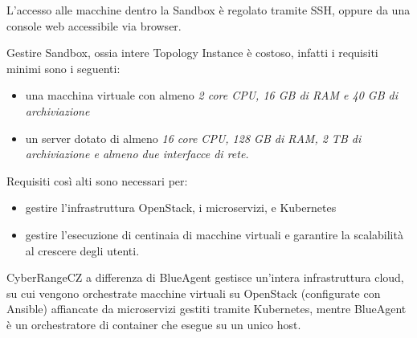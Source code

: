 L'accesso alle macchine dentro la Sandbox è regolato tramite SSH, oppure
da una console web accessibile via browser.

Gestire Sandbox, ossia intere Topology Instance è costoso, infatti i
requisiti minimi sono i seguenti:

\begin{itemize}
\tightlist
\item
  una macchina virtuale con almeno \emph{2 core CPU, 16 GB di RAM e 40
  GB di archiviazione}
\item
  un server dotato di almeno \emph{16 core CPU, 128 GB di RAM, 2 TB di
  archiviazione e almeno due interfacce di rete.}
\end{itemize}

Requisiti così alti sono necessari per:

\begin{itemize}
\tightlist
\item
  gestire l'infrastruttura OpenStack, i microservizi, e Kubernetes
\item
  gestire l'esecuzione di centinaia di macchine virtuali e garantire la
  scalabilità al crescere degli utenti.
\end{itemize}

CyberRangeCZ a differenza di BlueAgent gestisce un'intera infrastruttura
cloud, su cui vengono orchestrate macchine virtuali su OpenStack
(configurate con Ansible) affiancate da microservizi gestiti tramite
Kubernetes, mentre BlueAgent è un orchestratore di container che esegue
su un unico host.

